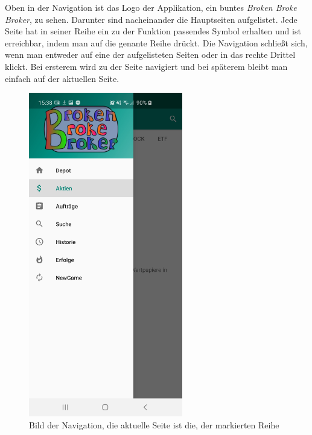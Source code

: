 \documentclass[10pt]{scrartcl}
\begin{document}
Oben in der Navigation ist das Logo der Applikation, ein buntes \textit{Broken Broke Broker}, zu sehen. Darunter sind nacheinander die Hauptseiten aufgelistet. Jede Seite hat in seiner Reihe ein zu der Funktion passendes Symbol erhalten und ist erreichbar, indem man auf die genante Reihe drückt. Die Navigation schließt sich, wenn man entweder auf eine der aufgelisteten Seiten oder in das rechte Drittel klickt. Bei ersterem wird zu der Seite navigiert und bei späterem bleibt man einfach auf der aktuellen Seite.

\begin{figure}[H]
	\centering
	\includegraphics[width=0.6\textwidth]{Bilder/Applikation/Navigation.jpg}
	\caption{Bild der Navigation, die aktuelle Seite ist die, der markierten Reihe}
\end{figure}
\end{document}
